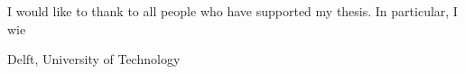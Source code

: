 \documentclass[a4paper,11pt]{mscThesis}
\begin{document}
    I would like to thank to all people who have supported my thesis. In particular, I wie

    \vspace*{15mm}

    \noindent
    Delft, University of Technology \hfill \mscname\\ %
    \mscdate


%
    


\appendix


    




    
\begin{comment}
	


    \chapter{Yet another appendix}

    \section{Another test section}

    Ok, all is well.

    \printindex%
    \cleardoublepage%
    
\end{comment}
   
\end{document}
